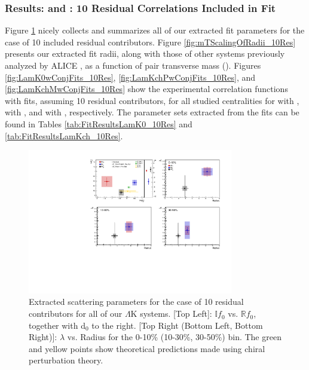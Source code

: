 \documentclass[../AnalysisNoteJBuxton.tex]{subfiles}
\begin{document}
\subsubsection{Results: \LamKs and \LamKpm: 10 Residual Correlations Included in Fit}
\label{ResultsLamK_10Res}

Figure \ref{fig:ScattParams_10Res} nicely collects and summarizes all of our extracted fit parameters for the case of 10 included residual contributors.  Figure \ref{fig:mTScalingOfRadii_10Res} presents our extracted fit radii, along with those of other systems previously analyzed by ALICE \cite{Adam:2015vja}, as a function of pair transverse mass (\mt).
Figures \ref{fig:LamK0wConjFits_10Res}, \ref{fig:LamKchPwConjFits_10Res}, and \ref{fig:LamKchMwConjFits_10Res} show the experimental correlation functions with fits, assuming 10 residual contributors, for all studied centralities for \LamKs with \ALamKs, \LamKchP with \ALamKchM, and \LamKchM with \ALamKchP, respectively.
The parameter sets extracted from the fits can be found in Tables \ref{tab:FitResultsLamK0_10Res} and \ref{tab:FitResultsLamKch_10Res}.

\begin{figure}[h]
  \centering
  \includegraphics[width=0.80\textwidth]{7_ResultsAndDiscussion/Figures/CompareAllScattParams_Comp3An_10Res.pdf}
  \caption[Extracted Scattering Parameters: 3 Residuals in Fit]{Extracted scattering parameters for the case of 10 residual contributors for all of our $\Lambda$K systems.  [Top Left]: $\mathbb{I}f_{0}$ vs. $\mathbb{R}f_{0}$, together with d$_{0}$ to the right.  [Top Right (Bottom Left, Bottom Right)]: $\lambda$ vs. Radius for the 0-10\% (10-30\%, 30-50\%) bin.  The green \cite{Liu:2006xja} and yellow \cite{Mai:2009ce} points show theoretical predictions made using chiral perturbation theory.}
  \label{fig:ScattParams_10Res}
\end{figure}
\end{document}
